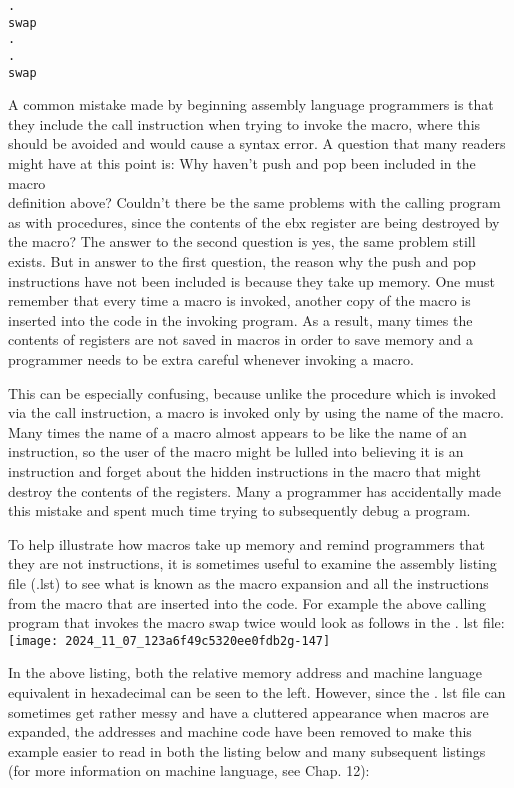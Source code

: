 \documentclass[10pt]{article}
\begin{document}
\begin{verbatim}
.
swap
.
.
swap
\end{verbatim}

A common mistake made by beginning assembly language programmers is that they include the call instruction when trying to invoke the macro, where this should be avoided and would cause a syntax error. A question that many readers might have at this point is: Why haven't push and pop been included in the macro\\
definition above? Couldn't there be the same problems with the calling program as with procedures, since the contents of the ebx register are being destroyed by the macro? The answer to the second question is yes, the same problem still exists. But in answer to the first question, the reason why the push and pop instructions have not been included is because they take up memory. One must remember that every time a macro is invoked, another copy of the macro is inserted into the code in the invoking program. As a result, many times the contents of registers are not saved in macros in order to save memory and a programmer needs to be extra careful whenever invoking a macro.

This can be especially confusing, because unlike the procedure which is invoked via the call instruction, a macro is invoked only by using the name of the macro. Many times the name of a macro almost appears to be like the name of an instruction, so the user of the macro might be lulled into believing it is an instruction and forget about the hidden instructions in the macro that might destroy the contents of the registers. Many a programmer has accidentally made this mistake and spent much time trying to subsequently debug a program.

To help illustrate how macros take up memory and remind programmers that they are not instructions, it is sometimes useful to examine the assembly listing file (.lst) to see what is known as the macro expansion and all the instructions from the macro that are inserted into the code. For example the above calling program that invokes the macro swap twice would look as follows in the . lst file:\\
\texttt{[image: 2024\_11\_07\_123a6f49c5320ee0fdb2g-147]}

In the above listing, both the relative memory address and machine language equivalent in hexadecimal can be seen to the left. However, since the . lst file can sometimes get rather messy and have a cluttered appearance when macros are expanded, the addresses and machine code have been removed to make this example easier to read in both the listing below and many subsequent listings (for more information on machine language, see Chap. 12):
\end{document}
